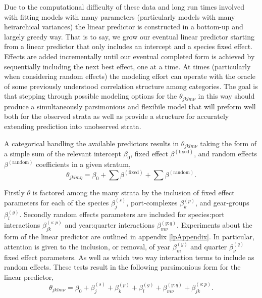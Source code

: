\documentclass[12pt]{article}
\begin{document}
%
Due to the computational difficulty of these data and long run times involved 
with fitting models with many parameters (particularly models with many 
heirarchical variances) the linear predictor is constructed in a bottom-up and 
largely greedy way. That is to say, we grow our eventual linear 
predictor starting from a linear predictor that only includes an intercept and 
a species fixed effect. Effects are added incrementally until our eventual 
completed form is achieved by sequentially including the next best effect, one 
at a time. At times (particularly when considering random effects) the modeling 
effort can operate with the oracle of some previously understood correlation %
structure among categories. 
%
The goal is that stepping through possible modeling options for the  
$\theta_{jklm\nu}$ in this way should produce a simultaneously parsimonious 
and flexibile model that will preform well both for the observed strata as 
well as provide a structure for accurately extending prediction into unobserved 
strata. %
%

%
A categorical handling the available predictors results in $\theta_{jklm\nu}$ 
taking the form of a simple sum of the relevant intercept $\beta_0$, fixed 
effect $\beta^{(\text{fixed})}$, and random effects $\beta^{(\text{random})}$ 
coefficients in a given stratum, 
%
\begin{equation}
\theta_{jklm\eta} = \beta_0 + \sum\beta^{(\text{fixed})} + \sum\beta^{(\text{random})}.
\end{equation}

%
Firstly $\theta$ is factored among the many strata by the inclusion of 
fixed effect parameters for each of the species $\beta^{(s)}_j$, 
port-complexes $\beta^{(p)}_k$, and gear-groups $\beta^{(g)}_l$. Secondly 
random effects parameters are included for species:port interactions 
$\beta^{(s:p)}_{jk}$ and year:quarter interactions $\beta^{(y:q)}_{m\nu}$.
Experiments about the form of the linear predictor are outlined in appendix 
\ref{lpAppendix}. In particular, attention is given to the inclusion, or 
removal, of year $\beta^{(y)}_m$ and quarter $\beta^{(q)}_\nu$ fixed effect 
parameters. As well as which two way interaction terms to include as random 
effects. These tests result in the following parsimonious form for the linear 
predictor,
%
\begin{equation}
\theta_{jklm\nu} = \beta_0 + \beta^{(s)}_j + \beta^{(p)}_k + \beta^{(g)}_l + \beta^{(y:q)}_{m\nu} + \beta^{(s:p)}_{jk}.
\end{equation}
\end{document}
